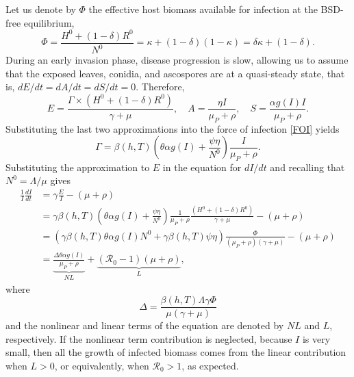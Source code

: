 \documentclass[11pt]{article}
\numberwithin{equation}{section}
\begin{document}
Let us denote by $\Phi$ the effective host biomass available for infection at the BSD-free equilibrium,
\begin{equation}
    \Phi=\frac{H^0+(1-\delta)R^0}{N^0}=\kappa+(1-\delta)(1-\kappa)=\delta \kappa+(1-\delta).
\end{equation}
During an early invasion phase, disease progression is slow, allowing us to assume that the exposed leaves, conidia, and ascospores are at a quasi-steady state, that is, $dE/dt=dA/dt=dS/dt=0$. Therefore,
\begin{equation}
    E=\frac{\Gamma\times\left(H^0+(1-\delta)R^0\right)}{\gamma+\mu},\quad A=\frac{\eta I}{\mu_P+\rho},\quad S=\frac{\alpha g(I)I}{\mu_P+\rho}.
\end{equation}
Substituting the last two approximations into the force of infection \eqref{FOI} yields
\begin{equation}
    \Gamma=\beta(h,T)\left(\theta\alpha g(I)+\frac{\psi\eta}{N^0}\right)\frac{I}{\mu_P+\rho}.
\end{equation}
Substituting the approximation to $E$ in the equation for $dI/dt$ and recalling that $N^0=\Lambda/\mu$ gives
\begin{align*}
    \frac{1}{I}\frac{dI}{dt} &= \gamma \frac{E}{I} -(\mu+\rho)\\
    &= \gamma \beta(h,T)\left(\theta\alpha g(I)+\frac{\psi\eta}{N^0}\right)\frac{1}{\mu_P+\rho}\frac{\left(H^0+(1-\delta)R^0\right)}{\gamma+\mu}-(\mu+\rho)\\[10pt]
    &=(\gamma \beta(h,T) \theta \alpha g(I) N^0+\gamma \beta(h,T)\psi\eta)\frac{\Phi}{(\mu_P+\rho)(\gamma+\mu)}-(\mu+\rho) \\[10pt]
    &=\underbrace{\frac{\Delta\theta\alpha g(I)}{\mu_P+\rho}}_{NL}+\underbrace{(\mathcal{R}_0-1)(\mu+\rho)}_{L},
\end{align*}
where  
\begin{equation*}
    \Delta=\frac{\beta(h,T)\Lambda\gamma\Phi}{\mu(\gamma+\mu)}
\end{equation*}
and the nonlinear and linear terms of the equation are denoted by $NL$ and $L$, respectively.
If the nonlinear term contribution is neglected, because $I$ is very small, then all the growth of infected biomass comes from the linear contribution when $L>0$, or equivalently, when $\mathcal{R}_0>1$, as expected.  
\end{document}
